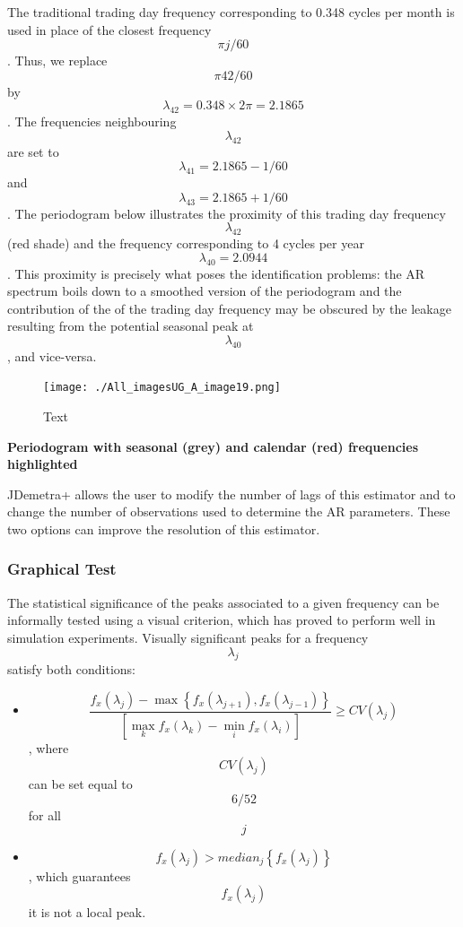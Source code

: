 \documentclass[
  letterpaper,
  DIV=11,
  numbers=noendperiod]{scrreprt}
\providecommand{\tightlist}{%
  \setlength{\itemsep}{0pt}\setlength{\parskip}{0pt}}\usepackage{longtable,booktabs,array}
\begin{document}
The traditional trading day frequency corresponding to 0.348 cycles per
month is used in place of the closest frequency \[\pi j/60\]. Thus, we
replace \[\pi 42/60\] by \[\lambda_{42}=0.348\times 2 \pi = 2.1865 \].
The frequencies neighbouring \[ \lambda_{42}\] are set to
\[ \lambda_{41}= 2.1865-1/60 \] and \[\lambda_{43}= 2.1865+1/60\]. The
periodogram below illustrates the proximity of this trading day
frequency \[\lambda_{42}\] (red shade) and the frequency corresponding
to 4 cycles per year \[\lambda_{40}=2.0944\]. This proximity is
precisely what poses the identification problems: the AR spectrum boils
down to a smoothed version of the periodogram and the contribution of
the of the trading day frequency may be obscured by the leakage
resulting from the potential seasonal peak at \[\lambda_{40}\], and
vice-versa.

\begin{figure}

{\centering \texttt{[image: ./All\_imagesUG\_A\_image19.png]}

}

\caption{Text}

\end{figure}

\textbf{Periodogram with seasonal (grey) and calendar (red) frequencies
highlighted}

JDemetra+ allows the user to modify the number of lags of this estimator
and to change the number of observations used to determine the AR
parameters. These two options can improve the resolution of this
estimator.

\hypertarget{graphical-test-1}{%
\subsubsection{Graphical Test}\label{graphical-test-1}}

The statistical significance of the peaks associated to a given
frequency can be informally tested using a visual criterion, which has
proved to perform well in simulation experiments. Visually significant
peaks for a frequency \[\lambda_{j}\] satisfy both conditions:

\begin{itemize}
\tightlist
\item
  \[ \frac{f_{x}(\lambda_{j})- \max \left\{f_{x}(\lambda_{j+1}),f_{x}(\lambda_{j-1}) \right\}}{\left[ \max_{k}f_{x}(\lambda_{k})-\min_{i}f_{x}(\lambda_{i}) \right]}\ge CV(\lambda_{j}) \],
  where \[ CV(\lambda_{j})\] can be set equal to \[6/52 \] for all \[j\]
\item
  \[ f_{x}(\lambda_{j})> median_{j} \left\{ f_{x}(\lambda_{j}) \right\}\],
  which guarantees \[ f_{x}(\lambda_{j}) \] it is not a local peak.
\end{itemize}
\end{document}
